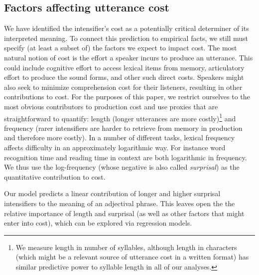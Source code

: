 \documentclass[10pt,letterpaper]{article}
\begin{document}

% 


\subsection{Factors affecting utterance cost}

We have identified the intensifier's cost as a potentially critical determiner of its interpreted meaning. To connect this prediction to empirical facts, we still must specify (at least a subset of) the factors we expect to impact cost.
The most natural notion of cost is the effort a speaker incurs to produce an utterance. This could include cognitive effort to access lexical items from memory, articulatory effort to produce 
the sound forms, and other such direct costs.
Speakers might also seek to minimize comprehension cost for their listeners, resulting in other contributions to cost. 
For the purposes of this paper, we restrict ourselves to the most
obvious contributors to production cost and use proxies that are straightforward to quantify: length (longer utterances are more costly)\footnote{
  We measure length in number of syllables, although length in characters (which might be a relevant source of utterance cost in a written format) has similar predictive power to syllable length in all of our analyses.
}
and frequency (rarer intensifiers are harder to retrieve from memory in production and therefore more costly).
In a number of different tasks, lexical frequency affects difficulty in an approximately logarithmic way. For instance word recognition time \cite{McCusker1977} 
and reading time in context \cite{smithLevy} are both logarithmic in frequency. We thus use the log-frequency (whose negative is also called \emph{surprisal}) as the quantitative contribution to cost.

Our model predicts a linear contribution of longer and higher surprisal intensifiers to the meaning of an adjectival phrase. 
This leaves open the the relative importance of length and surprisal (as well as other factors that might enter into cost), which can be explored via regression models.
\end{document}
